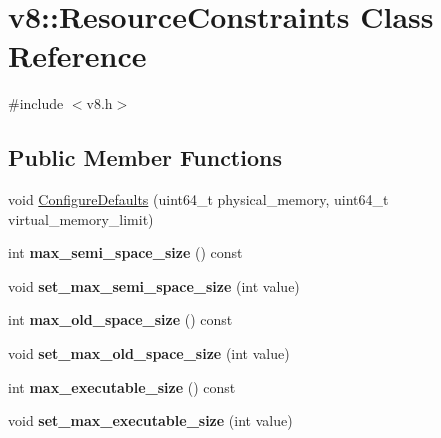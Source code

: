 \hypertarget{classv8_1_1ResourceConstraints}{}\section{v8\+:\+:Resource\+Constraints Class Reference}
\label{classv8_1_1ResourceConstraints}


{\ttfamily \#include $<$v8.\+h$>$}

\subsection*{Public Member Functions}
\begin{DoxyCompactItemize}
\item 
void \hyperlink{classv8_1_1ResourceConstraints_aeeaaee4017e8d5f8f0439af2af2ed3a5}{Configure\+Defaults} (uint64\+\_\+t physical\+\_\+memory, uint64\+\_\+t virtual\+\_\+memory\+\_\+limit)
\item 
\hypertarget{classv8_1_1ResourceConstraints_aeeecbbdb2c7880bf74d5d7fb9bbc52b3}{}int {\bfseries max\+\_\+semi\+\_\+space\+\_\+size} () const \label{classv8_1_1ResourceConstraints_aeeecbbdb2c7880bf74d5d7fb9bbc52b3}

\item 
\hypertarget{classv8_1_1ResourceConstraints_ac83efbf72458c872009f66019352409e}{}void {\bfseries set\+\_\+max\+\_\+semi\+\_\+space\+\_\+size} (int value)\label{classv8_1_1ResourceConstraints_ac83efbf72458c872009f66019352409e}

\item 
\hypertarget{classv8_1_1ResourceConstraints_a72840efdbcfc7bb287c6aea38d0b07b9}{}int {\bfseries max\+\_\+old\+\_\+space\+\_\+size} () const \label{classv8_1_1ResourceConstraints_a72840efdbcfc7bb287c6aea38d0b07b9}

\item 
\hypertarget{classv8_1_1ResourceConstraints_aa764be7c76b4baa3fce7a54c3777b5e9}{}void {\bfseries set\+\_\+max\+\_\+old\+\_\+space\+\_\+size} (int value)\label{classv8_1_1ResourceConstraints_aa764be7c76b4baa3fce7a54c3777b5e9}

\item 
\hypertarget{classv8_1_1ResourceConstraints_a037777e608ed1c22fe294ecef5722036}{}int {\bfseries max\+\_\+executable\+\_\+size} () const \label{classv8_1_1ResourceConstraints_a037777e608ed1c22fe294ecef5722036}

\item 
\hypertarget{classv8_1_1ResourceConstraints_a37d1b38672e9844c567823a119dcd557}{}void {\bfseries set\+\_\+max\+\_\+executable\+\_\+size} (int value)\label{classv8_1_1ResourceConstraints_a37d1b38672e9844c567823a119dcd557}


\end{DoxyCompactItemize}
